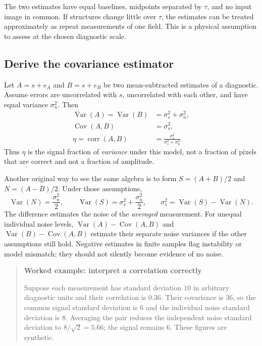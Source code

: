 \documentclass[11pt]{article}
\newcommand{\Var}{\operatorname{Var}}
\newcommand{\Cov}{\operatorname{Cov}}
\newenvironment{teaching}[1]{\begin{quote}\small\textbf{#1}\par}{\end{quote}}
\begin{document}
The two estimates have equal baselines, midpoints separated by $\tau$, and
no input image in common. If structures change little over $\tau$, the
estimates can be treated approximately as repeat measurements of one field.
This is a physical assumption to assess at the chosen diagnostic scale.

\subsection{Derive the covariance estimator}

Let $A=s+e_A$ and $B=s+e_B$ be two mean-subtracted estimates of a diagnostic.
Assume errors are uncorrelated with $s$, uncorrelated with each other, and
have equal variance $\sigma_n^2$. Then
\begin{align}
 \Var(A)=\Var(B)&=\sigma_s^2+\sigma_n^2,\\
 \Cov(A,B)&=\sigma_s^2,\\
 \eta=\operatorname{corr}(A,B)&=
 \frac{\sigma_s^2}{\sigma_s^2+\sigma_n^2}.
\end{align}
Thus $\eta$ is the signal fraction of \emph{variance} under this model,
not a fraction of pixels that are correct and not a fraction of amplitude.

Another original way to see the same algebra is to form
$S=(A+B)/2$ and $N=(A-B)/2$. Under those assumptions,
\begin{equation}
 \Var(N)=\frac{\sigma_n^2}{2},\qquad
 \Var(S)=\sigma_s^2+\frac{\sigma_n^2}{2},\qquad
 \sigma_s^2=\Var(S)-\Var(N).
\end{equation}
The difference estimates the noise of the \emph{averaged} measurement.
For unequal individual noise levels, $\Var(A)-\Cov(A,B)$ and
$\Var(B)-\Cov(A,B)$ estimate their separate noise variances if the other
assumptions still hold. Negative estimates in finite samples flag instability
or model mismatch; they should not silently become evidence of no noise.

\begin{teaching}{Worked example: interpret a correlation correctly}
Suppose each measurement has standard deviation $10$ in arbitrary diagnostic
units and their correlation is 0.36. Their covariance is 36, so the common
signal standard deviation is $6$ and the individual noise standard deviation
is $8$. Averaging the pair reduces the independent noise standard deviation
to $8/\sqrt2=5.66$; the signal remains $6$. These figures are synthetic.
\end{teaching}
\end{document}
